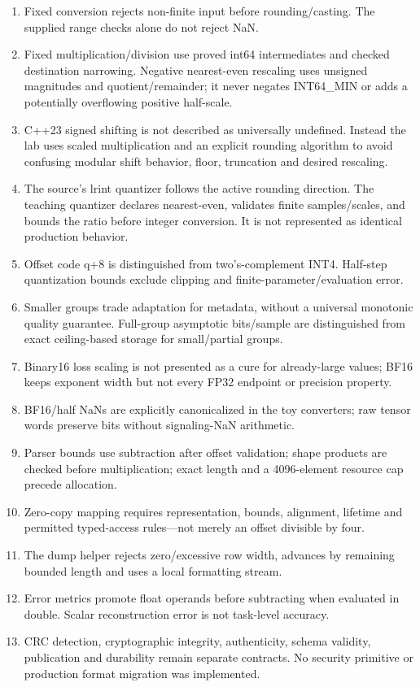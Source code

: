 \begin{enumerate}
\def\labelenumi{\arabic{enumi}.}
\tightlist
\item
  Fixed conversion rejects non-finite input before rounding/casting. The supplied range checks alone do not reject NaN.
\item
  Fixed multiplication/division use proved int64 intermediates and checked destination narrowing. Negative nearest-even rescaling uses unsigned magnitudes and quotient/remainder; it never negates INT64\_MIN or adds a potentially overflowing positive half-scale.
\item
  C++23 signed shifting is not described as universally undefined. Instead the lab uses scaled multiplication and an explicit rounding algorithm to avoid confusing modular shift behavior, floor, truncation and desired rescaling.
\item
  The source's lrint quantizer follows the active rounding direction. The teaching quantizer declares nearest-even, validates finite samples/scales, and bounds the ratio before integer conversion. It is not represented as identical production behavior.
\item
  Offset code q+8 is distinguished from two's-complement INT4. Half-step quantization bounds exclude clipping and finite-parameter/evaluation error.
\item
  Smaller groups trade adaptation for metadata, without a universal monotonic quality guarantee. Full-group asymptotic bits/sample are distinguished from exact ceiling-based storage for small/partial groups.
\item
  Binary16 loss scaling is not presented as a cure for already-large values; BF16 keeps exponent width but not every FP32 endpoint or precision property.
\item
  BF16/half NaNs are explicitly canonicalized in the toy converters; raw tensor words preserve bits without signaling-NaN arithmetic.
\item
  Parser bounds use subtraction after offset validation; shape products are checked before multiplication; exact length and a 4096-element resource cap precede allocation.
\item
  Zero-copy mapping requires representation, bounds, alignment, lifetime and permitted typed-access rules---not merely an offset divisible by four.
\item
  The dump helper rejects zero/excessive row width, advances by remaining bounded length and uses a local formatting stream.
\item
  Error metrics promote float operands before subtracting when evaluated in double. Scalar reconstruction error is not task-level accuracy.
\item
  CRC detection, cryptographic integrity, authenticity, schema validity, publication and durability remain separate contracts. No security primitive or production format migration was implemented.
\end{enumerate}


